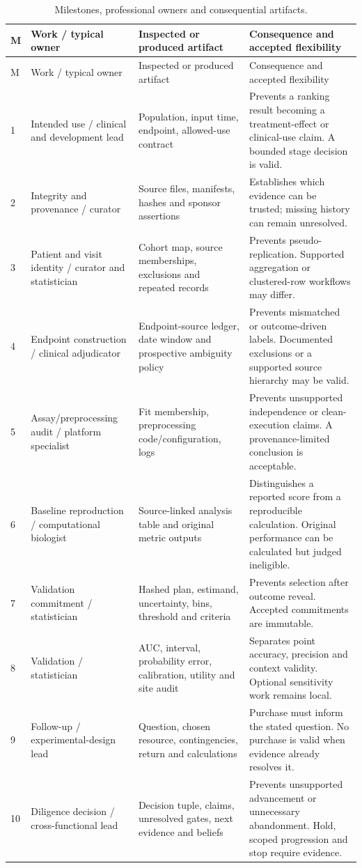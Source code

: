 \documentclass[11pt,a4paper]{article}
\begin{document}
\begin{longtable}{@{}p{}p{}p{}p{}@{}}
\caption{Milestones, professional owners and consequential artifacts.}\label{tab:milestones}\\
\toprule M & Work / typical owner & Inspected or produced artifact & Consequence and accepted flexibility \\\midrule\endfirsthead
\toprule M & Work / typical owner & Inspected or produced artifact & Consequence and accepted flexibility \\\midrule\endhead
1 & Intended use / clinical and development lead & Population, input time, endpoint, allowed-use contract & Prevents a ranking result becoming a treatment-effect or clinical-use claim. A bounded stage decision is valid. \\
2 & Integrity and provenance / curator & Source files, manifests, hashes and sponsor assertions & Establishes which evidence can be trusted; missing history can remain unresolved. \\
3 & Patient and visit identity / curator and statistician & Cohort map, source memberships, exclusions and repeated records & Prevents pseudo-replication. Supported aggregation or clustered-row workflows may differ. \\
4 & Endpoint construction / clinical adjudicator & Endpoint-source ledger, date window and prospective ambiguity policy & Prevents mismatched or outcome-driven labels. Documented exclusions or a supported source hierarchy may be valid. \\
5 & Assay/preprocessing audit / platform specialist & Fit membership, preprocessing code/configuration, logs & Prevents unsupported independence or clean-execution claims. A provenance-limited conclusion is acceptable. \\
6 & Baseline reproduction / computational biologist & Source-linked analysis table and original metric outputs & Distinguishes a reported score from a reproducible calculation. Original performance can be calculated but judged ineligible. \\
7 & Validation commitment / statistician & Hashed plan, estimand, uncertainty, bins, threshold and criteria & Prevents selection after outcome reveal. Accepted commitments are immutable. \\
8 & Validation / statistician & AUC, interval, probability error, calibration, utility and site audit & Separates point accuracy, precision and context validity. Optional sensitivity work remains local. \\
9 & Follow-up / experimental-design lead & Question, chosen resource, contingencies, return and calculations & Purchase must inform the stated question. No purchase is valid when evidence already resolves it. \\
10 & Diligence decision / cross-functional lead & Decision tuple, claims, unresolved gates, next evidence and beliefs & Prevents unsupported advancement or unnecessary abandonment. Hold, scoped progression and stop require evidence. \\\bottomrule
\end{longtable}
\end{document}
